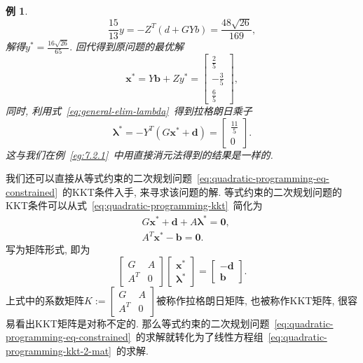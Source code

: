 \documentclass{SBCbookchapter}
\newcommand{\V}[1]{{\bm{#1}}}
\newtheorem{eg}[thm]{例}
\numberwithin{equation}{section}
\begin{document}
\begin{eg}
\begin{equation*}
\frac{15}{13} y = - Z^T \left( d + G Y b \right) = \frac{48 \sqrt{26}}{169},
\end{equation*}
解得$y^* = \frac{16 \sqrt{26}}{65}.$ 回代得到原问题的最优解
\begin{equation*}
\V{x}^* = Y \V{b} + Z y^* = \left[\begin{matrix} \frac{2}{5} \\ - \frac{3}{5} \\ \frac{6}{5} \end{matrix}\right],
\end{equation*}
同时, 利用式~\eqref{eq:general-elim-lambda}~得到拉格朗日乘子
\begin{equation*}
\V{\lambda}^* = - Y^T \left( G \V{x}^* + \V{d} \right) = \left[\begin{matrix} \frac{11}{5} \\ 0 \end{matrix}\right].
\end{equation*}
这与我们在例~\eqref{eg:7.2.1}~中用直接消元法得到的结果是一样的.
\end{eg}

我们还可以直接从等式约束的二次规划问题~\eqref{eq:quadratic-programming-eq-constrained}~的KKT条件入手, 来寻求该问题的解. 等式约束的二次规划问题的KKT条件可以从式~\eqref{eq:quadratic-programming-kkt}~简化为
\begin{equation}
\label{eq:quadratic-programming-kkt-2}
\begin{aligned}
& G \V{x}^* + \V{d} + A \V{\lambda}^* = \V{0}, \\
& A^T \V{x}^* - \V{b} = \V{0}.
\end{aligned}
\end{equation}
写为矩阵形式, 即为
\begin{equation}
\label{eq:quadratic-programming-kkt-2-mat}
\begin{bmatrix} G & A \\ A^T & 0 \end{bmatrix} \begin{bmatrix} \V{x}^* \\ \V{\lambda}^* \end{bmatrix} = \begin{bmatrix} -\V{d} \\ \V{b} \end{bmatrix}.
\end{equation}
上式中的系数矩阵$K := \begin{bmatrix} G & A \\ A^T & 0 \end{bmatrix}$被称作拉格朗日矩阵, 也被称作KKT矩阵, 很容易看出KKT矩阵是对称不定的. 那么等式约束的二次规划问题~\eqref{eq:quadratic-programming-eq-constrained}~的求解就转化为了线性方程组~\eqref{eq:quadratic-programming-kkt-2-mat}~的求解.
\end{document}
